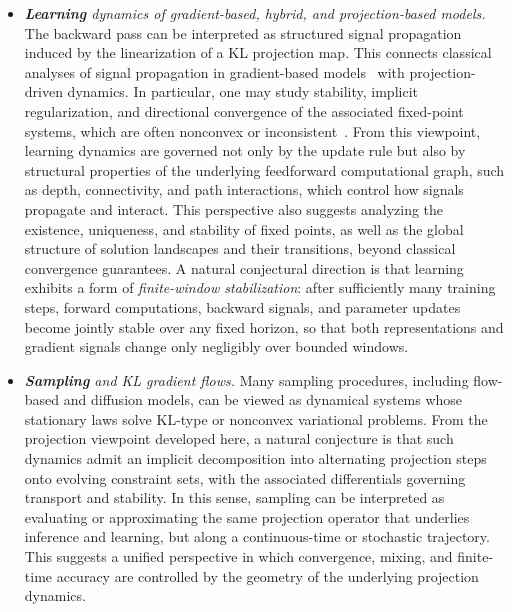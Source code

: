 \documentclass[12pt]{article}
\newcommand{\1}{\mathbb{1}}
\theoremstyle{definition}
\begin{document}
\begin{itemize}[leftmargin=1.5em,itemsep=0.25em]

\item \emph{\textbf{Learning} dynamics of gradient-based, hybrid, and projection-based models.}
The backward pass can be interpreted as structured signal propagation~\cite{schoenholz2017deep} induced by the linearization of a KL projection map. This connects classical analyses of signal propagation in gradient-based models~\cite{roberts2022principles} with projection-driven dynamics. In particular, one may study stability, implicit regularization, and directional convergence of the associated fixed-point systems, which are often nonconvex or inconsistent~\cite{alwadani2021behaviour,andrews2025augmented,dinh2025algorithmic,moursi2016douglas,singh2024strong}. 
From this viewpoint, learning dynamics are governed not only by the update rule but also by structural properties of the underlying feedforward computational graph, such as depth, connectivity, and path interactions, which control how signals propagate and interact. This perspective also suggests analyzing the existence, uniqueness, and stability of fixed points, as well as the global structure of solution landscapes and their transitions, beyond classical convergence guarantees. A natural conjectural direction is that learning exhibits a form of \emph{finite-window stabilization}: after sufficiently many training steps, forward computations, backward signals, and parameter updates become jointly stable over any fixed horizon, so that both representations and gradient signals change only negligibly over bounded windows.

\item \emph{\textbf{Sampling} and KL gradient flows.}
Many sampling procedures, including flow-based and diffusion models, can be viewed as dynamical systems whose stationary laws solve KL-type or nonconvex variational problems. From the projection viewpoint developed here, a natural conjecture is that such dynamics admit an implicit decomposition into alternating projection steps onto evolving constraint sets, with the associated differentials governing transport and stability. In this sense, sampling can be interpreted as evaluating or approximating the same projection operator that underlies inference and learning, but along a continuous-time or stochastic trajectory. This suggests a unified perspective in which convergence, mixing, and finite-time accuracy are controlled by the geometry of the underlying projection dynamics.


\end{itemize}
\end{document}
